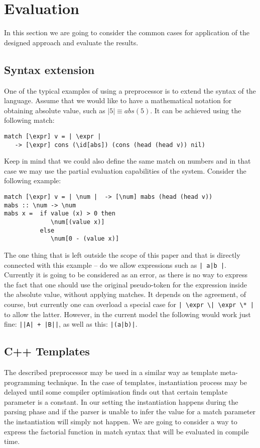 \section{Evaluation}

In this section we are going to consider the common cases for
application of the designed approach and evaluate the results.

\subsection{Syntax extension}

One of the typical examples of using a preprocessor is to extend the
syntax of the language.  Assume that we would like to have a mathematical 
notation for obtaining absolute value, such as $\left|5\right| \equiv abs(5)$. 
It can be achieved using the following match:
\begin{verbatim}
match [\expr] v = | \expr | 
   -> [\expr] cons (\id[abs]) (cons (head (head v)) nil)
\end{verbatim}

Keep in mind that we could also define the same match on numbers
and in that case we may use the partial evaluation capabilities of 
the system.  Consider the following example:
\begin{verbatim}
match [\expr] v = | \num |  -> [\num] mabs (head (head v))
mabs :: \num -> \num
mabs x =  if value (x) > 0 then
             \num[(value x)]
          else
             \num[0 - (value x)]
\end{verbatim}

The one thing that is left outside the scope of this paper and that 
is directly connected with this example -- do we allow expressions such as
\verb/| a|b |/.  Currently it is going to be considered as an error, as there is
no way to express the fact that one should use the original pseudo-token
for the expression inside the absolute value,
without applying matches.  It depends on the agreement, of course,
but currently one can overload a special case for 
\verb/| \expr \| \expr \* |/ to allow the latter.  However, in the
current model the following would work just fine: \verb/||A| + |B||/, 
as well as this: \verb/|(a|b)|/.

\subsection{C++ Templates}

The described preprocessor may be used in a similar way as template
meta-programming technique.  In the case of templates, instantiation process
may be delayed until some compiler optimisation finds out that certain template
parameter is a constant.  In our setting the instantiation happens during the
parsing phase and if the parser is unable to infer the value for a match
parameter the instantiation will simply not happen.  We are going to consider a
way to express the factorial function in match syntax that will be evaluated in
compile time.

